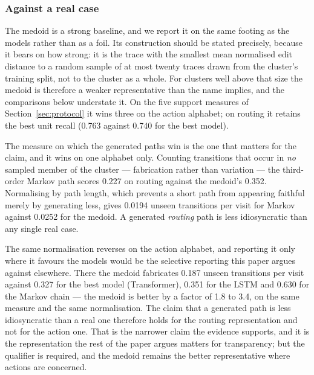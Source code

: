 





\subsubsection{Against a real case}

The medoid is a strong baseline, and we report it on the same footing as the models rather than
as a foil. Its construction should be stated precisely, because it bears on how strong: it is
the trace with the smallest mean normalised edit distance to a random sample of at most twenty
traces drawn from the cluster's training split, not to the cluster as a whole. For clusters well
above that size the medoid is therefore a weaker representative than the name implies, and the
comparisons below understate it. On the five support measures of Section~\ref{sec:protocol} it
wins three on the action alphabet; on routing it retains the best unit recall (0.763 against
0.740 for the best model).

The measure on which the generated paths win is the one that matters for the claim, and it wins
on one alphabet only. Counting transitions that occur in \emph{no} sampled member of the cluster
--- fabrication rather than variation --- the third-order Markov path scores 0.227 on routing
against the medoid's 0.352. Normalising by path length, which prevents a short path from
appearing faithful merely by generating less, gives 0.0194 unseen transitions per visit for
Markov against 0.0252 for the medoid. A generated \emph{routing} path is less idiosyncratic than
any single real case.

The same normalisation reverses on the action alphabet, and reporting it only where it favours
the models would be the selective reporting this paper argues against elsewhere. There the
medoid fabricates 0.187 unseen transitions per visit against 0.327 for the best model
(Transformer), 0.351 for the LSTM and 0.630 for the Markov chain --- the medoid is better by a
factor of 1.8 to 3.4, on the same measure and the same normalisation. The claim that a generated
path is less idiosyncratic than a real one therefore holds for the routing representation and
not for the action one. That is the narrower claim the evidence supports, and it is the
representation the rest of the paper argues matters for transparency; but the qualifier is
required, and the medoid remains the better representative where actions are concerned.


